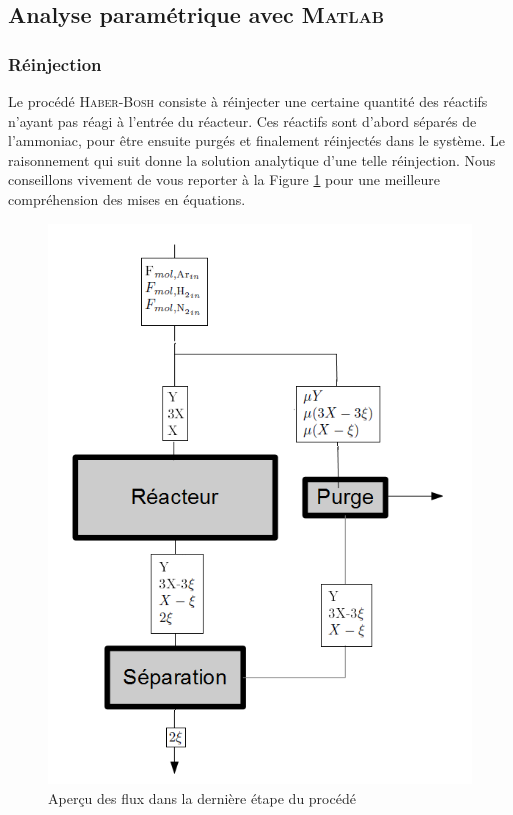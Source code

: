 \subsection{Analyse paramétrique avec \textsc{Matlab}}

\subsubsection{Réinjection}
Le procédé \textsc{Haber-Bosh} consiste à réinjecter une certaine quantité des réactifs n'ayant pas réagi à l'entrée du réacteur. Ces réactifs sont d'abord séparés de l'ammoniac, pour être ensuite purgés et finalement réinjectés dans le système. Le raisonnement qui suit donne la solution analytique d'une telle réinjection. Nous conseillons vivement de vous reporter à la Figure \ref{Schema_synthese} pour une meilleure compréhension des mises en équations.

\begin{figure}[ht!]
\centering
\includegraphics[scale=0.4]{Schema_synthese.png}
\caption{Aperçu des flux dans la dernière étape du procédé}
\label{Schema_synthese}
\end{figure}

